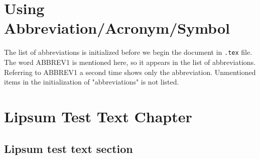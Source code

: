 \chapter{Using Abbreviation/Acronym/Symbol}
The list of abbreviations is initialized before we begin the document in \texttt{.tex} file. The word \ac{ABBREV1} is mentioned here, so it appears in the list of abbreviations. Referring to \ac{ABBREV1} a second time shows only the abbreviation. Unmentioned items in the initialization of "abbreviations" is not listed. 
\chapter{Lipsum Test Text Chapter}
\section{Lipsum test text section}
\kant[1]

\nocite{*}

